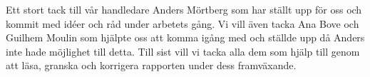 Ett stort tack till  vår handledare Anders Mörtberg som har ställt upp för oss
och kommit med idéer och råd  under arbetets gång.
Vi vill även tacka Ana Bove och Guilhem Moulin
som hjälpte oss att komma igång med \coq{} och ställde upp då Anders inte hade
möjlighet till detta.
Till sist vill vi tacka alla dem som hjälp till genom att läsa, granska och
korrigera rapporten under dess framväxande.